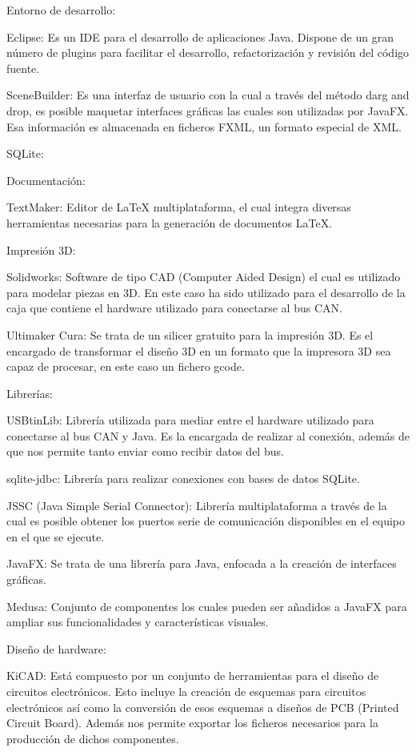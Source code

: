 Entorno de desarrollo:

Eclipse: Es un IDE para el desarrollo de aplicaciones Java. Dispone de un gran número de plugins para facilitar el desarrollo, refactorización y revisión del código fuente.

SceneBuilder: Es una interfaz de usuario con la cual a través del método darg and drop, es posible maquetar interfaces gráficas las cuales son utilizadas por JavaFX. Esa información es almacenada en ficheros FXML, un formato especial de XML.

SQLite:

Documentación:

TextMaker: Editor de LaTeX multiplataforma, el cual integra diversas herramientas necesarias para la generación de documentos LaTeX.


Impresión 3D:

Solidworks: Software de tipo CAD (Computer Aided Design) el cual es utilizado para modelar piezas en 3D. En este caso ha sido utilizado para el desarrollo de la caja que contiene el hardware utilizado para conectarse al bus CAN.

Ultimaker Cura: Se trata de un silicer gratuito para la impresión 3D. Es el encargado de transformar el diseño 3D en un formato que la impresora 3D sea capaz de procesar, en este caso un fichero gcode.

Librerías:

USBtinLib: Librería utilizada para mediar entre el hardware utilizado para conectarse al bus CAN y Java. Es la encargada de realizar al conexión, además de que nos permite tanto enviar como recibir datos del bus. 

sqlite-jdbc: Librería para realizar conexiones con bases de datos SQLite.

JSSC (Java Simple Serial Connector): Librería multiplataforma a través de la cual es posible obtener los puertos serie de comunicación disponibles en el equipo en el que se ejecute.

JavaFX: Se trata de una librería para Java, enfocada a la creación de interfaces gráficas.

Medusa: Conjunto de componentes los cuales pueden ser añadidos a JavaFX para ampliar sus funcionalidades y características visuales.

Diseño de hardware:

KiCAD: Está compuesto por un conjunto de herramientas para el diseño de circuitos electrónicos. Esto incluye la creación de esquemas para circuitos electrónicos así como la conversión de esos esquemas a diseños de PCB (Printed Circuit Board). Además nos permite exportar los ficheros necesarios para la producción de dichos componentes.

